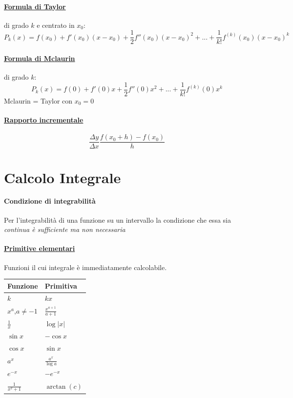 \documentclass[12pt, a4paper]{article}
\begin{document}
\paragraph*{\underline{Formula di Taylor}} di grado $k$ e centrato in $x_0$:
$$P_k(x)=f(x_0)+f'(x_0)(x-x_0) + \frac{1}{2}f''(x_0)(x-x_0)^2 +... + \frac{1}{k!}f^{(k)}(x_0)(x-x_0)^k$$

\paragraph*{\underline{Formula di Mclaurin}} di grado $k$:
$$P_k(x)=f(0)+f'(0)x+\frac{1}{2}f''(0)x^2+...+\frac{1}{k!}f^{(k)}(0)x^k$$
\small{Mclaurin = Taylor con $x_0=0$}

\paragraph*{\underline{Rapporto incrementale}}
$$\frac{\Delta y}{ \Delta x}\frac{f(x_0+h)-f(x_0)}{h} $$


\section*{Calcolo Integrale}
\paragraph*{Condizione di integrabilità} Per l'integrabilità di una funzione su un intervallo la condizione
che essa sia \emph{continua è sufficiente ma non necessaria}
\begin{multicols}{3}
	\paragraph*{\underline{Primitive elementari}}
	Funzioni il cui integrale è immediatamente calcolabile.
	\columnbreak
	\begin{tabularx}{0.7\textwidth}{ |Y|Y| }
		\hline
		\textbf{Funzione} & \textbf{Primitiva}    \\
		\hline
		$k$               & $kx$                  \\
		$x^a$,$a\neq-1$   & $\frac{x^{a+1}}{a+1}$ \\
		$\frac{1}{x}$     & $\log|x|$             \\
		$\sin x$          & $-\cos x$             \\
		$\cos x $         & $\sin x$              \\
		$a^x$             & $\frac{a^x}{\log a}$  \\
		\hline
		$e^{-x}$          & $-e^{-x}$             \\
		$\frac{1}{x^2+1}$ & $\arctan (c)$ \\
		\hline
	\end{tabularx}
\end{multicols}
\end{document}
